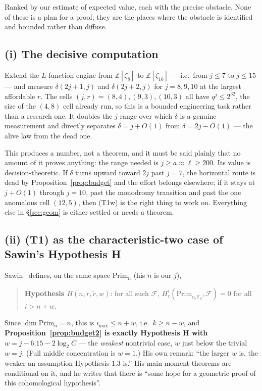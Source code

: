 \documentclass[10pt]{article}
\theoremstyle{plain}
\theoremstyle{definition}
\newcommand{\F}{\mathbb F}
\newcommand{\Z}{\mathbb Z}
\newcommand{\Prim}{\mathrm{Prim}}
\newcommand{\imax}{i_{\max}}
\begin{document}
Ranked by our estimate of expected value, each with the precise obstacle. None
of these is a plan for a proof; they are the places where the obstacle is
identified and bounded rather than diffuse.

\subsection*{(i) The decisive computation}

Extend the $L$-function engine from $\Z[\zeta_8]$ to $\Z[\zeta_{16}]$ --- i.e.\
from $j\le7$ to $j\le15$ --- and measure $\delta(2j+1,j)$ and $\delta(2j+2,j)$
for $j=8,9,10$ at the largest affordable $r$. The cells $(j,r)=(8,4),(9,3),(10,3)$
all have $q^j\le2^{32}$, the size of the $(4,8)$ cell already run, so this is a
bounded engineering task rather than a research one. It doubles the $j$-range
over which $\delta$ is a genuine measurement and directly separates
$\delta=j+O(1)$ from $\delta=2j-O(1)$ --- the alive law from the dead one.

This produces a number, not a theorem, and it must be said plainly that no
amount of it proves anything: the range needed is $j\ge a\approx\ell\ge200$.
Its value is decision-theoretic. If $\delta$ turns upward toward $2j$ past
$j=7$, the horizontal route is dead by Proposition~\ref{prop:budget} and the
effort belongs elsewhere; if it stays at $j+O(1)$ through $j=10$, past the
monodromy transition and past the one anomalous cell $(12,5)$, then (T1w) is
the right thing to work on. Everything else in \S\ref{sec:geom} is either
settled or needs a theorem.

\subsection*{(ii) (T1) as the characteristic-two case of Sawin's Hypothesis H}

Sawin~\cite{SawinH} defines, on the same space $\Prim_n$ (his $n$ is our $j$),
\begin{quote}
\textbf{Hypothesis $H(n,r,\tilde r,w)$}: for all such $\mathcal F$,
$H^i_c(\Prim_{n,\overline{\F_q}},\mathcal F)=0$ for all $i>n+w$.
\end{quote}
Since $\dim\Prim_n=n$, this is $\imax\le n+w$, i.e.\ $k\ge n-w$, and
\textbf{Proposition~\ref{prop:budget2} is exactly Hypothesis H with
$w=j-6.15-2\log_2C$} --- the \emph{weakest} nontrivial case, $w$ just below the
trivial $w=j$. (Full middle concentration is $w=1$.) His own remark: ``the
larger $w$ is, the weaker an assumption Hypothesis 1.3 is.'' His main moment
theorems are conditional on it, and he writes that there is ``some hope for a
geometric proof of this cohomological hypothesis''.
\end{document}
